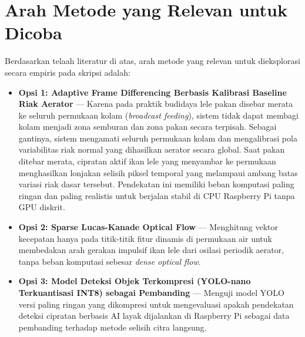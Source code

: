 \documentclass[11pt,a4paper]{article}
\begin{document}
\section{Arah Metode yang Relevan untuk Dicoba}
Berdasarkan telaah literatur di atas, arah metode yang relevan untuk dieksplorasi secara empiris pada skripsi adalah:
\begin{itemize}
    \item \textbf{Opsi 1: Adaptive Frame Differencing Berbasis Kalibrasi Baseline Riak Aerator} --- Karena pada praktik budidaya lele pakan disebar merata ke seluruh permukaan kolam (\textit{broadcast feeding}), sistem tidak dapat membagi kolam menjadi zona semburan dan zona pakan secara terpisah. Sebagai gantinya, sistem mengamati seluruh permukaan kolam dan mengalibrasi pola variabilitas riak normal yang dihasilkan aerator secara global. Saat pakan ditebar merata, cipratan aktif ikan lele yang menyambar ke permukaan menghasilkan lonjakan selisih piksel temporal yang melampaui ambang batas variasi riak dasar tersebut. Pendekatan ini memiliki beban komputasi paling ringan dan paling realistis untuk berjalan stabil di CPU Raspberry Pi tanpa GPU diskrit.
    \item \textbf{Opsi 2: Sparse Lucas-Kanade Optical Flow} --- Menghitung vektor kecepatan hanya pada titik-titik fitur dinamis di permukaan air untuk membedakan arah gerakan impulsif ikan lele dari osilasi periodik aerator, tanpa beban komputasi sebesar \textit{dense optical flow}.
    \item \textbf{Opsi 3: Model Deteksi Objek Terkompresi (YOLO-nano Terkuantisasi INT8) sebagai Pembanding} --- Menguji model YOLO versi paling ringan yang dikompresi untuk mengevaluasi apakah pendekatan deteksi cipratan berbasis AI layak dijalankan di Raspberry Pi sebagai data pembanding terhadap metode selisih citra langsung.
\end{itemize}
\end{document}
